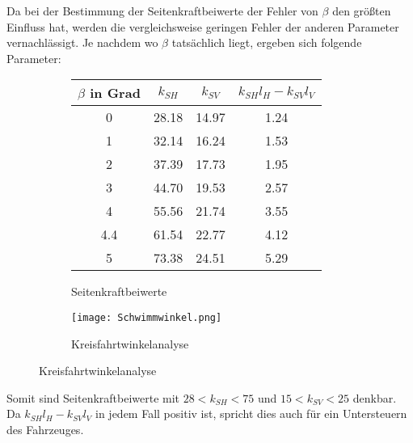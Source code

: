 Da bei der Bestimmung der Seitenkraftbeiwerte der Fehler von $\beta$ den größten Einfluss hat, werden die vergleichsweise geringen Fehler der anderen Parameter vernachlässigt. Je nachdem wo $\beta$ tatsächlich liegt, ergeben sich folgende Parameter:

\begin{center}
\begin{figure}[H]
\begin{subfigure}{.5\textwidth}
	\centering
	\begin{tabular}{|c|c|c|c|}
\hline
$\beta$ in Grad & $k_{SH}$& $k_{SV}$&$k_{SH}l_H-k_{SV}l_V$ \\\hline

0  & 28.18 & 14.97&1.24\\\hline
1  & 32.14 & 16.24&1.53\\\hline
2  & 37.39 & 17.73&1.95\\\hline
3  & 44.70 & 19.53&2.57\\\hline
4  & 55.56 & 21.74&3.55\\\hline
4.4  & 61.54 & 22.77&4.12\\\hline
5  & 73.38 & 24.51&5.29\\\hline

\end{tabular}
	\caption{Seitenkraftbeiwerte}
	\label{fig:Seitenkraftbeiwerte}
\end{subfigure}
\begin{subfigure}{.4\textwidth}
	\centering
	\texttt{[image: Schwimmwinkel.png]}
	\caption{Kreisfahrtwinkelanalyse}
	\label{fig:Kreis}
\end{subfigure}
\end{figure}
\end{center}\vspace{-0.7cm}
Somit sind Seitenkraftbeiwerte mit $28<k_{SH}<75$ und $15<k_{SV}<25$ denkbar. Da $k_{SH}l_H-k_{SV}l_V$ in jedem Fall positiv ist, spricht dies auch für ein Untersteuern des Fahrzeuges.

